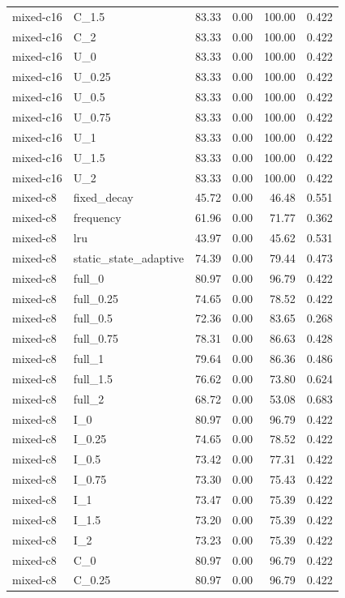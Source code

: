 \begin{longtable}{llrrrr}
mixed-c16 & C\_1.5 & 83.33 & 0.00 & 100.00 & 0.422\\
mixed-c16 & C\_2 & 83.33 & 0.00 & 100.00 & 0.422\\
mixed-c16 & U\_0 & 83.33 & 0.00 & 100.00 & 0.422\\
mixed-c16 & U\_0.25 & 83.33 & 0.00 & 100.00 & 0.422\\
mixed-c16 & U\_0.5 & 83.33 & 0.00 & 100.00 & 0.422\\
mixed-c16 & U\_0.75 & 83.33 & 0.00 & 100.00 & 0.422\\
mixed-c16 & U\_1 & 83.33 & 0.00 & 100.00 & 0.422\\
mixed-c16 & U\_1.5 & 83.33 & 0.00 & 100.00 & 0.422\\
mixed-c16 & U\_2 & 83.33 & 0.00 & 100.00 & 0.422\\
mixed-c8 & fixed\_decay & 45.72 & 0.00 & 46.48 & 0.551\\
mixed-c8 & frequency & 61.96 & 0.00 & 71.77 & 0.362\\
mixed-c8 & lru & 43.97 & 0.00 & 45.62 & 0.531\\
mixed-c8 & static\_state\_adaptive & 74.39 & 0.00 & 79.44 & 0.473\\
mixed-c8 & full\_0 & 80.97 & 0.00 & 96.79 & 0.422\\
mixed-c8 & full\_0.25 & 74.65 & 0.00 & 78.52 & 0.422\\
mixed-c8 & full\_0.5 & 72.36 & 0.00 & 83.65 & 0.268\\
mixed-c8 & full\_0.75 & 78.31 & 0.00 & 86.63 & 0.428\\
mixed-c8 & full\_1 & 79.64 & 0.00 & 86.36 & 0.486\\
mixed-c8 & full\_1.5 & 76.62 & 0.00 & 73.80 & 0.624\\
mixed-c8 & full\_2 & 68.72 & 0.00 & 53.08 & 0.683\\
mixed-c8 & I\_0 & 80.97 & 0.00 & 96.79 & 0.422\\
mixed-c8 & I\_0.25 & 74.65 & 0.00 & 78.52 & 0.422\\
mixed-c8 & I\_0.5 & 73.42 & 0.00 & 77.31 & 0.422\\
mixed-c8 & I\_0.75 & 73.30 & 0.00 & 75.43 & 0.422\\
mixed-c8 & I\_1 & 73.47 & 0.00 & 75.39 & 0.422\\
mixed-c8 & I\_1.5 & 73.20 & 0.00 & 75.39 & 0.422\\
mixed-c8 & I\_2 & 73.23 & 0.00 & 75.39 & 0.422\\
mixed-c8 & C\_0 & 80.97 & 0.00 & 96.79 & 0.422\\
mixed-c8 & C\_0.25 & 80.97 & 0.00 & 96.79 & 0.422\\

\end{longtable}
